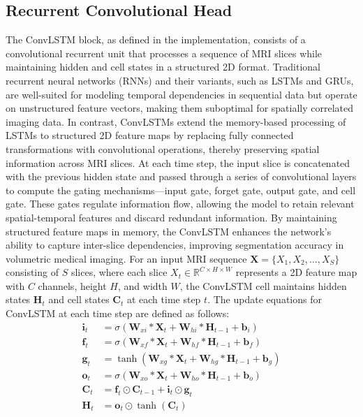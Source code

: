 \documentclass[journal]{IEEEtran}
\begin{document}
\subsection{Recurrent Convolutional Head}
The ConvLSTM block, as defined in the implementation, consists of a convolutional recurrent unit that processes a sequence of MRI slices while maintaining hidden and cell states in a structured 2D format. Traditional recurrent neural networks (RNNs) and their variants, such as LSTMs and GRUs, are well-suited for modeling temporal dependencies in sequential data but operate on unstructured feature vectors, making them suboptimal for spatially correlated imaging data. In contrast, ConvLSTMs extend the memory-based processing of LSTMs to structured 2D feature maps by replacing fully connected transformations with convolutional operations, thereby preserving spatial information across MRI slices. At each time step, the input slice is concatenated with the previous hidden state and passed through a series of convolutional layers to compute the gating mechanisms—input gate, forget gate, output gate, and cell gate. These gates regulate information flow, allowing the model to retain relevant spatial-temporal features and discard redundant information. By maintaining structured feature maps in memory, the ConvLSTM enhances the network's ability to capture inter-slice dependencies, improving segmentation accuracy in volumetric medical imaging. For an input MRI sequence \( \mathbf{X} = \{X_1, X_2, ..., X_S\} \) consisting of \( S \) slices, where each slice \( X_t \in \mathbb{R}^{C \times H \times W} \) represents a 2D feature map with \( C \) channels, height \( H \), and width \( W \), the ConvLSTM cell maintains hidden states \( \mathbf{H}_t \) and cell states \( \mathbf{C}_t \) at each time step \( t \). The update equations for ConvLSTM at each time step are defined as follows:
\begin{align}
\mathbf{i}_t &= \sigma(\mathbf{W}_{xi} * \mathbf{X}_t + \mathbf{W}_{hi} * \mathbf{H}_{t-1} + \mathbf{b}_i) \\
\mathbf{f}_t &= \sigma(\mathbf{W}_{xf} * \mathbf{X}_t + \mathbf{W}_{hf} * \mathbf{H}_{t-1} + \mathbf{b}_f) \\
\mathbf{g}_t &= \tanh(\mathbf{W}_{xg} * \mathbf{X}_t + \mathbf{W}_{hg} * \mathbf{H}_{t-1} + \mathbf{b}_g) \\
\mathbf{o}_t &= \sigma(\mathbf{W}_{xo} * \mathbf{X}_t + \mathbf{W}_{ho} * \mathbf{H}_{t-1} + \mathbf{b}_o) \\
\mathbf{C}_t &= \mathbf{f}_t \odot \mathbf{C}_{t-1} + \mathbf{i}_t \odot \mathbf{g}_t \\
\mathbf{H}_t &= \mathbf{o}_t \odot \tanh(\mathbf{C}_t)
\end{align}
\end{document}

